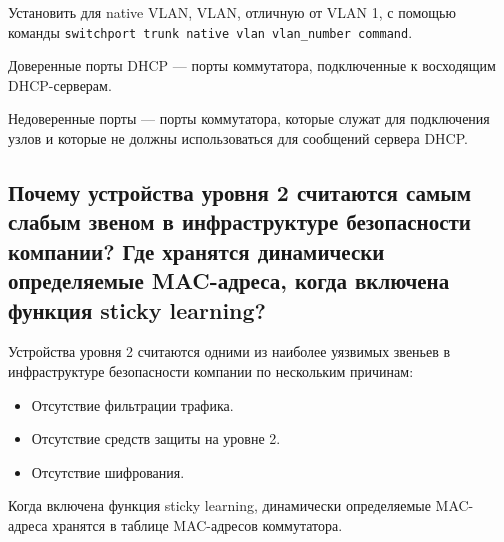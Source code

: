Установить для native VLAN, VLAN, отличную от VLAN 1, с помощью 
команды \verb|switchport trunk native vlan vlan_number command|.\par
Доверенные порты DHCP --- порты коммутатора, подключенные 
к восходящим DHCP-серверам.\par
Недоверенные порты --- порты коммутатора, которые служат для 
подключения узлов и которые не должны использоваться для 
сообщений сервера DHCP.

\subsection{Почему устройства уровня 2 считаются самым слабым звеном в 
инфраструктуре безопасности компании? Где хранятся 
динамически определяемые MAC-адреса, когда включена 
функция sticky learning?}

Устройства уровня 2 считаются одними из наиболее уязвимых звеньев 
в инфраструктуре безопасности компании по нескольким причинам:

\begin{itemize}
	\item Отсутствие фильтрации трафика.
	\item Отсутствие средств защиты на уровне 2.
	\item Отсутствие шифрования.
\end{itemize}

Когда включена функция sticky learning, динамически определяемые 
MAC-адреса хранятся в таблице MAC-адресов коммутатора.

